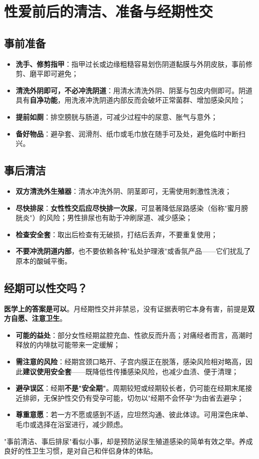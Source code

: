 \section{性爱前后的清洁、准备与经期性交}

\subsection{事前准备}

\begin{itemize}
	\item \textbf{洗手、修剪指甲}：指甲过长或边缘粗糙容易划伤阴道黏膜与外阴皮肤，事前修剪、磨平即可避免；
	\item \textbf{清洗外阴即可，不必冲洗阴道}：用清水清洗外阴、阴茎与包皮内侧即可。阴道具有\textbf{自净功能}，用洗液冲洗阴道内部反而会破坏正常菌群、增加感染风险；
	\item \textbf{提前如厕}：排空膀胱与肠道，可减少过程中的尿意、胀气与意外；
	\item \textbf{备好物品}：避孕套、润滑剂、纸巾或毛巾放在随手可及处，避免临时中断扫兴。
\end{itemize}

\subsection{事后清洁}

\begin{itemize}
	\item \textbf{双方清洗外生殖器}：清水冲洗外阴、阴茎即可，无需使用刺激性洗液；
	\item \textbf{尽快排尿}：\textbf{女性性交后应尽快排一次尿}，可显著降低尿路感染（俗称"蜜月膀胱炎"）的风险；男性排尿也有助于冲刷尿道、减少感染；
	\item \textbf{检查安全套}：取出后检查有无破损，打结后丢弃，不要重复使用；
	\item \textbf{不要冲洗阴道内部}，也不要依赖各种"私处护理液"或香氛产品——它们扰乱了原本的酸碱平衡。
\end{itemize}

\subsection{经期可以性交吗？}

\noindent\textbf{医学上的答案是可以}。月经期性交并非禁忌，没有证据表明它本身有害，前提是\textbf{双方自愿、注意卫生}。

\begin{itemize}
	\item \textbf{可能的益处}：部分女性经期盆腔充血、性欲反而升高；对痛经者而言，高潮时释放的内啡肽可能带来一定缓解；
	\item \textbf{需注意的风险}：经期宫颈口略开、子宫内膜正在脱落，感染风险相对略高，因此\textbf{建议使用安全套}——既降低性传播感染风险，也减少血渍、便于清理；
	\item \textbf{避孕误区}：经期\textbf{不是"安全期"}。周期较短或经期较长者，仍可能在经期末尾接近排卵，无保护性交仍有受孕可能，切勿以"经期不会怀孕"为由省去避孕；
	\item \textbf{尊重意愿}：若一方不愿或感到不适，应坦然沟通、彼此体谅。可用深色床单、毛巾或选择在浴室进行，减少顾虑。
\end{itemize}

\begin{tcolorbox}[colback=pink!5!white,colframe=red!50!black,title=贴心小叮咛]
"事前清洁、事后排尿"看似小事，却是预防泌尿生殖道感染的简单有效之举。养成良好的性卫生习惯，是对自己和伴侣身体的体贴。
\end{tcolorbox}

